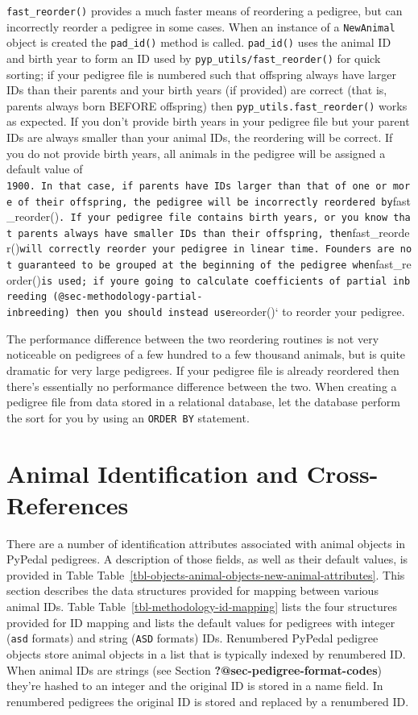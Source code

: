 \documentclass[
  letterpaper,
  DIV=11,
  numbers=noendperiod]{scrreprt}
\begin{document}
\texttt{fast\_reorder()} provides a much faster means of reordering a
pedigree, but can incorrectly reorder a pedigree in some cases. When an
instance of a \texttt{NewAnimal} object is created the
\texttt{pad\_id()} method is called. \texttt{pad\_id()} uses the animal
ID and birth year to form an ID used by
\texttt{pyp\_utils/fast\_reorder()} for quick sorting; if your pedigree
file is numbered such that offspring always have larger IDs than their
parents and your birth years (if provided) are correct (that is, parents
always born BEFORE offspring) then \texttt{pyp\_utils.fast\_reorder()}
works as expected. If you don't provide birth years in your pedigree
file but your parent IDs are always smaller than your animal IDs, the
reordering will be correct. If you do not provide birth years, all
animals in the pedigree will be assigned a default value of
\texttt{1900\textquotesingle{}.\ In\ that\ case,\ if\ parents\ have\ IDs\ larger\ than\ that\ of\ one\ or\ more\ of\ their\ offspring,\ the\ pedigree\ will\ be\ incorrectly\ reordered\ by}fast\_reorder()\texttt{.\ If\ your\ pedigree\ file\ contains\ birth\ years,\ or\ you\ know\ that\ parents\ always\ have\ smaller\ IDs\ than\ their\ offspring,\ then}fast\_reorder()\texttt{will\ correctly\ reorder\ your\ pedigree\ in\ linear\ time.\ Founders\ are\ not\ guaranteed\ to\ be\ grouped\ at\ the\ beginning\ of\ the\ pedigree\ when}fast\_reorder()\texttt{is\ used;\ if\ you\textquotesingle{}re\ going\ to\ calculate\ coefficients\ of\ partial\ inbreeding\ (@sec-methodology-partial-inbreeding)\ then\ you\ should\ instead\ use}reorder()`
to reorder your pedigree.

The performance difference between the two reordering routines is not
very noticeable on pedigrees of a few hundred to a few thousand animals,
but is quite dramatic for very large pedigrees. If your pedigree file is
already reordered then there's essentially no performance difference
between the two. When creating a pedigree file from data stored in a
relational database, let the database perform the sort for you by using
an \texttt{ORDER\ BY} statement.

\section{Animal Identification and
Cross-References}\label{sec-methodology-id-mapping}

There are a number of identification attributes associated with animal
objects in PyPedal pedigrees. A description of those fields, as well as
their default values, is provided in Table
Table~\ref{tbl-objects-animal-objects-new-animal-attributes}. This
section describes the data structures provided for mapping between
various animal IDs. Table Table~\ref{tbl-methodology-id-mapping} lists
the four structures provided for ID mapping and lists the default values
for pedigrees with integer (\texttt{asd} formats) and string
(\texttt{ASD} formats) IDs. Renumbered PyPedal pedigree objects store
animal objects in a list that is typically indexed by renumbered ID.
When animal IDs are strings (see Section
\textbf{?@sec-pedigree-format-codes}) they're hashed to an integer and
the original ID is stored in a name field. In renumbered pedigrees the
original ID is stored and replaced by a renumbered ID.
\end{document}
